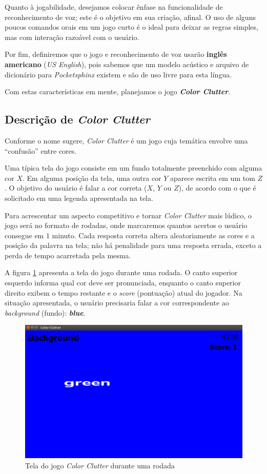Quanto à jogabilidade, desejamos colocar ênfase na funcionalidade de reconhecimento de voz; este é o objetivo em sua criação, afinal. O uso de alguns poucos comandos orais em um jogo curto é o ideal para deixar as regras simples, mas com interação razoável com o usuário.

Por fim, definiremos que o jogo e reconhecimento de voz usarão \textbf{inglês americano} (\textit{US English}), pois sabemos que um modelo acústico e arquivo de dicionário para \textit{Pocketsphinx} existem e são de uso livre para esta língua.

Com estas características em mente, planejamos o jogo \textbf{\emph{Color Clutter}}.


\subsection{Descrição de \textit{Color Clutter}}

Conforme o nome sugere, \textit{Color Clutter} é um jogo cuja temática envolve uma ``confusão'' entre cores.

Uma típica tela do jogo consiste em um fundo totalmente preenchido com alguma cor \(X\). Em alguma posição da tela, uma outra cor \(Y\) aparece escrita em um tom \(Z\). O objetivo do usuário é falar a cor correta (\(X\), \(Y\) ou \(Z\)), de acordo com o que é solicitado em uma legenda apresentada na tela.

Para acrescentar um aspecto competitivo e tornar \textit{Color Clutter} mais lúdico, o jogo será no formato de rodadas, onde marcaremos quantos acertos o usuário consegue em 1 minuto. Cada resposta correta altera aleatoriamente as cores e a posição da palavra na tela; não há penalidade para uma resposta errada, exceto a perda de tempo acarretada pela mesma.

A figura \ref{color-clutter-screen} apresenta a tela do jogo durante uma rodada. O canto superior esquerdo informa qual cor deve ser pronunciada, enquanto o canto superior direito exibem o tempo restante e o \textit{score} (pontuação) atual do jogador. Na situação apresentada, o usuário precisaria falar a cor correspondente ao \textit{background} (fundo): \textbf{\textit{blue}}.

\begin{figure}[H]
  \centering
  \includegraphics[width=.8\textwidth]{image/color-clutter-screen}
  \caption{Tela do jogo \textit{Color Clutter} durante uma rodada}
  \label{color-clutter-screen}
\end{figure}

